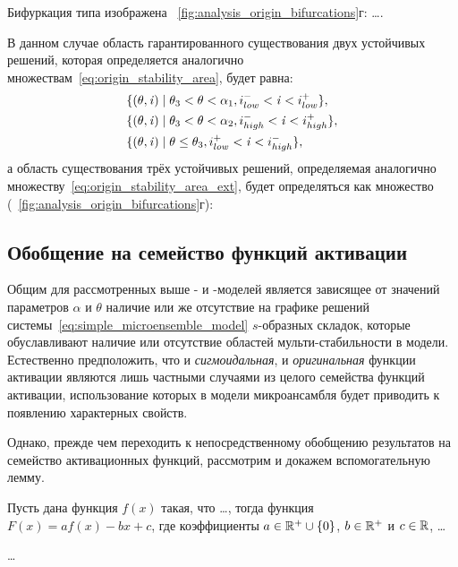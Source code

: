 Бифуркация типа  изображена \onfigure~\ref{fig:analysis_origin_bifurcations}г: \ldots . 

В данном случае область гарантированного существования двух устойчивых решений, которая определяется аналогично множествам~\eqref{eq:origin_stability_area}, будет равна:
\begin{equation}
    \nonumber
    \begin{aligned}
        &\{ (\theta, \mathit{i}) \mid \theta_{3} < \theta < \alpha_{1}, i^{-}_{low} < \mathit{i} < i^{+}_{low} \}, \\
        &\{ (\theta, \mathit{i}) \mid \theta_{3} < \theta < \alpha_{2}, i^{-}_{high} < \mathit{i} < i^{+}_{high} \}, \\
        &\{ (\theta, \mathit{i}) \mid \theta \le \theta_{3}, i^{+}_{low} < \mathit{i} < i^{-}_{high} \}, \\
    \end{aligned}
\end{equation}
а область существования трёх устойчивых решений, определяемая аналогично множеству~\eqref{eq:origin_stability_area_ext}, будет определяться как множество (\seefigure~\ref{fig:analysis_origin_bifurcations}г):


\subsection{Обобщение на семейство функций активации}  \label{subsection:analysis_custom}

Общим для рассмотренных выше - и -моделей является зависящее от значений параметров $\alpha$ и $\theta$ наличие или же отсутствие на графике решений системы~\eqref{eq:simple_microensemble_model} $s$-образных складок, которые обуславливают наличие или отсутствие областей мульти-стабильности в модели. Естественно предположить, что и \textit{сигмоидальная}, и \textit{оригинальная} функции активации являются лишь частными случаями из целого семейства функций активации, использование которых в модели микроансамбля будет приводить к появлению характерных свойств.

Однако, прежде чем переходить к непосредственному обобщению результатов на семейство активационных функций, рассмотрим и докажем вспомогательную лемму.
\begin{Lemma*}
    Пусть дана функция $f(x)$ такая, что \ldots, тогда функция $F(x) = a f(x) - b x + c$, где коэффициенты $a \in \mathbb{R}^{+} \cup \{0\}$, $b \in \mathbb{R}^{+}$ и $c \in \mathbb{R}$, \ldots
\end{Lemma*}
\begin{Proof}
    \ldots
\end{Proof}

